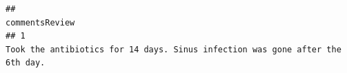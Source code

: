 \documentclass[spanish,]{article}
\begin{document}
\begin{verbatim}
##                                                                                                                                                                                                                                                                                                                                                                                                                                                                                                                                                                                                                                                                                                                                                                                                                                                                                                                                                                                                                                                                                                                                                                                                                                      commentsReview
## 1                                                                                                                                                                                                                                                                                                                                                                                                                                                                                                                                                                                                                                                                                                                                                                                                                                                                                                                                                                                                                                                                                                                                                                     Took the antibiotics for 14 days. Sinus infection was gone after the 6th day.

\end{verbatim}
\end{document}
